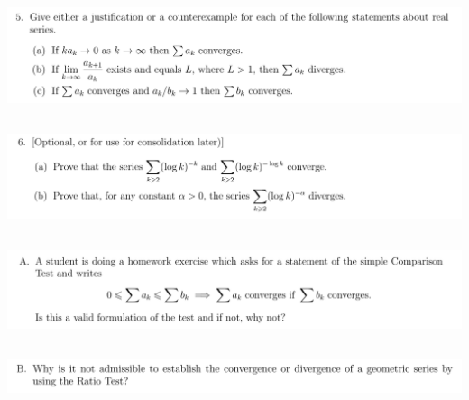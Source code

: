 \documentclass[12pt]{article}
\begin{document}
\newpage
\subsection{}
\begin{mdframed}
\includegraphics[width=400pt]{img/analysis--oxford-M2-I-6-5.png}
\end{mdframed}

\newpage
\subsection{}
\begin{mdframed}
\includegraphics[width=400pt]{img/analysis--oxford-M2-I-6-6.png}
\end{mdframed}

\newpage
\subsection{}
\begin{mdframed}
\includegraphics[width=400pt]{img/analysis--oxford-M2-I-6-extra-A.png}
\end{mdframed}

\newpage
\subsection{}
\begin{mdframed}
\includegraphics[width=400pt]{img/analysis--oxford-M2-I-6-extra-B.png}
\end{mdframed}
\end{document}
